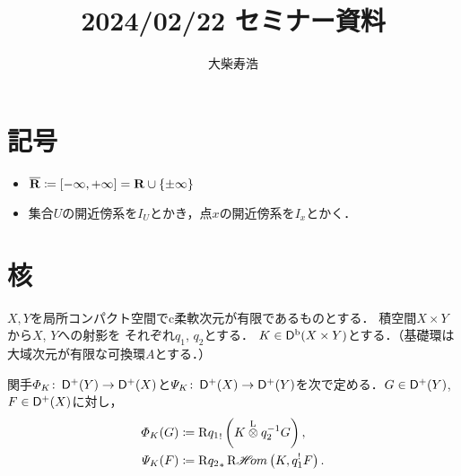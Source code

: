 





\def\inner<#1>{\langle #1 \rangle}








\title{2024/02/22 セミナー資料}
\author{大柴寿浩}
\date{}

\maketitle

\section*{記号}
\begin{itemize}
    \item \(\overline{\mathbf{R}}\coloneqq \left[-\infty,+\infty\right]=\mathbf{R}\cup\{\pm\infty\}\)
    \item 集合\(U\)の開近傍系を\(I_U\)とかき，点\(x\)の開近傍系を\(I_x\)とかく．
\end{itemize}



\section{核}
\(X,Y\)を局所コンパクト空間でc柔軟次元が有限であるものとする．
積空間\(X\times Y\)から\(X\), \(Y\)への射影を
それぞれ\(q_1\), \(q_2\)とする．
\(K\in\mathop{\mathsf{D}^\mathrm{b}}\nolimits(X\times Y)\)とする．（基礎環は大域次元が有限な可換環\(A\)とする．）

\begin{leftbar}
\begin{DFN}[{\cite[Definition 3.6.1]{KS90}}]
    関手\(
        \varPhi_K\colon\mathop{\mathsf{D}^\mathrm{+}}\nolimits(Y)\to\mathop{\mathsf{D}^\mathrm{+}}\nolimits(X)
    \)と\(
        \varPsi_K\colon\mathop{\mathsf{D}^\mathrm{+}}\nolimits(X)\to\mathop{\mathsf{D}^\mathrm{+}}\nolimits(Y)
    \)を次で定める．\(G\in\mathop{\mathsf{D}^\mathrm{+}}\nolimits(Y)\), \(F\in\mathop{\mathsf{D}^\mathrm{+}}\nolimits(X)\)に対し，
    \begin{align*}
        \varPhi_K(G)
        &\coloneqq\Rder{{q_1}_{!}}\left(
            K\ltens q_2^{-1} G
        \right), \\
        \varPsi_K(F)
        &\coloneqq\Rder{q_2}_\ast\RHOM\left(
            K,q_1^!{F}
        \right).
    \end{align*}
\end{DFN}
\end{leftbar}

